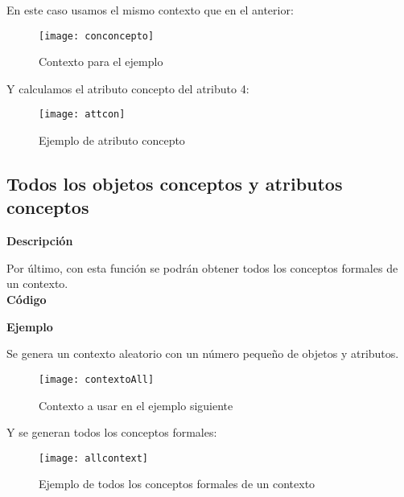         En este caso usamos el mismo contexto que en el anterior:

        \begin{figure}[H]
            \centering
            \texttt{[image: conconcepto]}
            \caption{Contexto para el ejemplo}
            \label{fig:conconcepto}
        \end{figure}

        Y calculamos el atributo concepto del atributo 4:

        \begin{figure}[H]
            \centering
            \texttt{[image: attcon]}
            \caption{Ejemplo de atributo concepto}
            \label{fig:attcon}
        \end{figure}



    \subsection{Todos los objetos conceptos y atributos conceptos}
       
        
        \textbf{Descripci\'on}

        Por \'ultimo, con esta funci\'on se podr\'an obtener todos los conceptos formales de un contexto.
        \\


        \textbf{C\'odigo}

        

        \bigskip

        \textbf{Ejemplo}

        Se genera un contexto aleatorio con un n\'umero peque\~no de objetos y atributos.

        \begin{figure}[H]
            \centering
            \texttt{[image: contextoAll]}
            \caption{Contexto a usar en el ejemplo siguiente}
            \label{fig:contextoAll}
        \end{figure}
        
        \bigskip
        Y se generan todos los conceptos formales:


        \begin{figure}[H]
            \centering
            \texttt{[image: allcontext]}
            \caption{Ejemplo de todos los conceptos formales de un contexto}
            \label{fig:allcontext}
        \end{figure}

